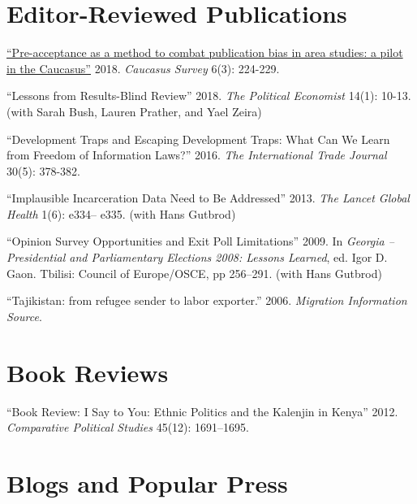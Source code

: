 \documentclass[margin,line]{res}
\begin{document}
{\begin{resume}
\section{\sc  Editor-Reviewed Publications}

\renewcommand{\labelenumi}{O\theenumi.}

\begin{etaremune}
\item \href{https://doi.org/10.1080/23761199.2018.1522796}{``Pre-acceptance as a method to combat publication bias in area studies: a pilot in the Caucasus''} 2018.  \emph{Caucasus Survey} 6(3): 224-229.
    
\item ``Lessons from Results-Blind Review'' 2018.  \emph{The
    Political Economist} 14(1): 10-13. (with Sarah Bush, Lauren Prather, and Yael Zeira)

 \item ``Development Traps and Escaping Development Traps: What Can We
  Learn from Freedom of Information Laws?'' 2016. \emph{The
    International Trade Journal } 30(5): 378-382.

 \item  ``Implausible Incarceration Data Need to Be Addressed''
  2013. \emph{The Lancet Global Health} 1(6): e334-- e335. (with Hans
  Gutbrod)

 \item  ``Opinion Survey Opportunities and Exit Poll Limitations'' 2009. In
  \emph{Georgia -- Presidential and Parliamentary Elections 2008:
    Lessons Learned}, ed. Igor D. Gaon. Tbilisi: Council of
  Europe/OSCE, pp 256--291. (with Hans Gutbrod)

\item  ``Tajikistan: from refugee sender to labor exporter.''
  2006. \emph{Migration Information Source}.
\end{etaremune}

 
\section{\sc Book Reviews}
\renewcommand{\labelenumi}{R\theenumi.}

\begin{etaremune}
``Book Review: I Say to You: Ethnic Politics and the Kalenjin in
Kenya'' 2012. \emph{Comparative Political Studies} 45(12): 1691--1695.
\end{etaremune}

\section{\sc Blogs and Popular Press}
\renewcommand{\labelenumi}{M\theenumi.}


\end{resume}}
\end{document}

